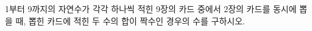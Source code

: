 \hspace*{2mm}\begin{minipage}[t]{\dimexpr\linewidth-2mm\relax}\vspace{0pt}
1부터 9까지의 자연수가 각각 하나씩 적힌 9장의 카드 중에서 2장의 카드를 동시에 뽑을 때, 뽑힌 카드에 적힌 두 수의 합이 짝수인 경우의 수를 구하시오.\end{minipage}
